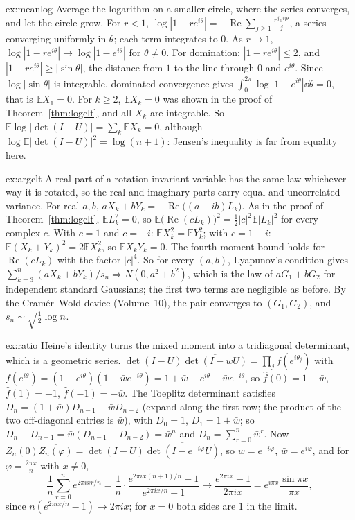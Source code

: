 \begin{solution}{ex:meanlog}
\idea Average the logarithm on a smaller circle, where the series converges, and let the circle grow.
\writeup For $r<1$, $\log|1-re^{i\theta}|=-\operatorname{Re}\sum_{j\ge1}\frac{r^je^{ij\theta}}j$, a series converging uniformly in $\theta$; each term integrates to $0$. As $r\to1$, $\log|1-re^{i\theta}|\to\log|1-e^{i\theta}|$ for $\theta\ne0$. For domination: $|1-re^{i\theta}|\le2$, and $|1-re^{i\theta}|\ge|\sin\theta|$, the distance from $1$ to the line through $0$ and $e^{i\theta}$. Since $\log|\sin\theta|$ is
integrable, dominated convergence gives $\int_0^{2\pi}\log|1-e^{i\theta}|\dd\theta=0$, that is $\mathbb EX_1=0$. For $k\ge2$, $\mathbb EX_k=0$ was shown in the proof of Theorem~\ref{thm:logclt}, and all $X_k$ are integrable. So
$\mathbb E\log|\det(I-U)|=\sum_k\mathbb EX_k=0$, although $\log\mathbb E|\det(I-U)|^2=\log(n+1)$: Jensen's inequality is far from equality here.
\end{solution}

\begin{solution}{ex:argclt}
\idea A real part of a rotation-invariant variable has the same law whichever way it is rotated, so the real and imaginary parts carry equal and uncorrelated variance.
\writeup For real $a,b$, $aX_k+bY_k=-\operatorname{Re}\bigl((a-ib)L_k\bigr)$. As in the proof of Theorem~\ref{thm:logclt}, $\mathbb EL_k^2=0$, so $\mathbb E\bigl(\operatorname{Re}(cL_k)\bigr)^2=\frac12|c|^2\mathbb E|L_k|^2$ for every complex $c$. With $c=1$ and $c=-i$:
$\mathbb EX_k^2=\mathbb EY_k^2$; with $c=1-i$: $\mathbb E(X_k+Y_k)^2=2\mathbb EX_k^2$, so $\mathbb EX_kY_k=0$. The fourth moment bound holds for $\operatorname{Re}(cL_k)$ with the factor $|c|^4$. So for every $(a,b)$, Lyapunov's condition gives
$\sum_{k=3}^n(aX_k+bY_k)/s_n\Rightarrow N(0,a^2+b^2)$, which is the law of $aG_1+bG_2$ for independent standard Gaussians; the first two terms are negligible as before. By the Cram\'er--Wold device (Volume~10), the pair converges to $(G_1,G_2)$, and
$s_n\sim\sqrt{\frac12\log n}$.
\end{solution}

\begin{solution}{ex:ratio}
\idea Heine's identity turns the mixed moment into a tridiagonal determinant, which is a geometric series.
\writeup $\det(I-U)\overline{\det(I-wU)}=\prod_jf(e^{i\theta_j})$ with $f(e^{i\theta})=(1-e^{i\theta})(1-\bar we^{-i\theta})=1+\bar w-e^{i\theta}-\bar we^{-i\theta}$, so $\hat f(0)=1+\bar w$, $\hat f(1)=-1$, $\hat f(-1)=-\bar w$. The Toeplitz determinant satisfies
$D_n=(1+\bar w)D_{n-1}-\bar wD_{n-2}$ (expand along the first row; the product of the two off-diagonal entries is $\bar w$), with $D_0=1$, $D_1=1+\bar w$; so $D_n-D_{n-1}=\bar w(D_{n-1}-D_{n-2})=\bar w^n$ and $D_n=\sum_{r=0}^n\bar w^r$.
Now $Z_n(0)\overline{Z_n(\varphi)}=\det(I-U)\overline{\det(I-e^{-i\varphi}U)}$, so $w=e^{-i\varphi}$, $\bar w=e^{i\varphi}$, and for $\varphi=\frac{2\pi x}n$ with $x\ne0$,
\[
\frac1n\sum_{r=0}^ne^{2\pi ixr/n}=\frac1n\cdot\frac{e^{2\pi ix(n+1)/n}-1}{e^{2\pi ix/n}-1}\longrightarrow\frac{e^{2\pi ix}-1}{2\pi ix}=e^{i\pi x}\frac{\sin\pi x}{\pi x},
\]
since $n(e^{2\pi ix/n}-1)\to2\pi ix$; for $x=0$ both sides are $1$ in the limit.
\end{solution}

